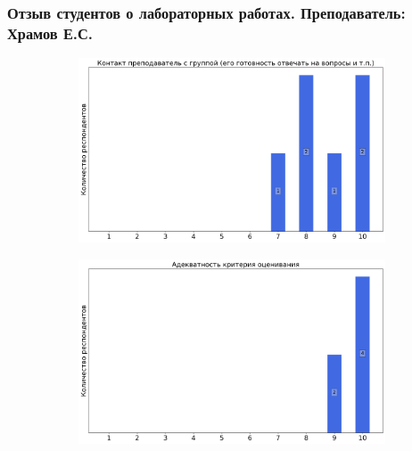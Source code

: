         
    \subsubsection{Отзыв студентов о лабораторных работах. Преподаватель: Храмов Е.С.}
            \begin{figure}[H]
            \centering
            \begin{subfigure}[b]{0.45\textwidth}
                \centering
                \includegraphics[width=\textwidth]{images/2 course/Радиотехнические цепи и сигналы/labniks-marks-Храмов Е.С.-0.png}
            \end{subfigure}
            \begin{subfigure}[b]{0.45\textwidth}
                \centering
                \includegraphics[width=\textwidth]{images/2 course/Радиотехнические цепи и сигналы/labniks-marks-Храмов Е.С.-1.png}
            \end{subfigure}
            \begin{subfigure}[b]{0.45\textwidth}
                \centering

\end{subfigure}
\end{figure}
